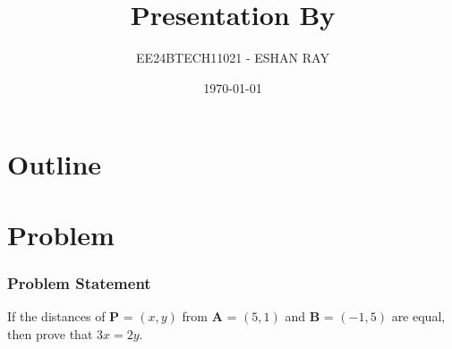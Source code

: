 \documentclass{beamer}
\title{Presentation By}
\author{EE24BTECH11021 - ESHAN RAY}
\date{\today}
\providecommand{\brak}[1]{\ensuremath{\left(#1\right)}}
\theoremstyle{remark}
\newcommand{\myvec}[1]{\ensuremath{\begin{pmatrix}#1\end{pmatrix}}}
\let\vec\mathbf
\numberwithin{equation}{section}
\begin{document}
\begin{frame}
\titlepage
\end{frame}

\section*{Outline}
\begin{frame}
\tableofcontents
\end{frame}
\section{Problem}
\begin{frame}
\frametitle{Problem Statement}
%
If the distances of $\vec P$ = \brak{x, y} from $\vec A$ = \brak{5, 1} and $\vec B$ = \brak{-1, 5} are equal, then prove that $3x = 2y$.
%

\end{frame}

\end{document}
